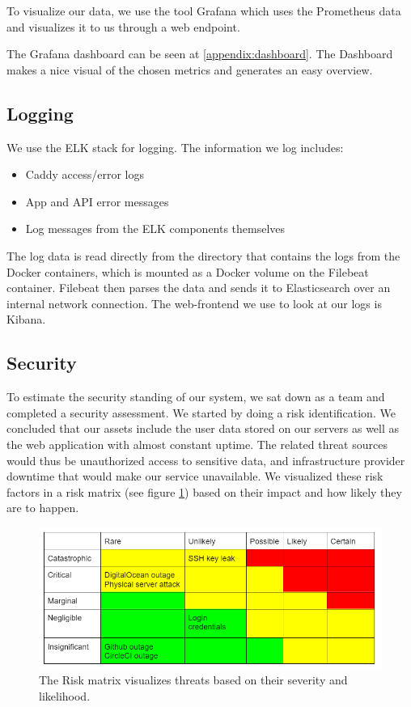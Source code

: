 To visualize our data, we use the tool Grafana which uses the Prometheus data and visualizes it to us through a web endpoint.

The Grafana dashboard can be seen at \ref{appendix:dashboard}. The Dashboard makes a nice visual of the chosen metrics and generates an easy overview.

\subsection{Logging}
We use the ELK stack for logging. The information we log includes:

\begin{itemize}
    \item Caddy access/error logs
    \item App and API error messages
    \item Log messages from the ELK components themselves
\end{itemize}

The log data is read directly from the directory that contains the logs from the Docker containers, which is mounted as a Docker volume on the Filebeat container. Filebeat then parses the data and sends it to Elasticsearch over an internal network connection. The web-frontend we use to look at our logs is Kibana.




\subsection{Security}
To estimate the security standing of our system, we sat down as a team and completed a security assessment. We started by doing a risk identification. We concluded that our assets include the user data stored on our servers as well as the web application with almost constant uptime. The related threat sources would thus be unauthorized access to sensitive data, and infrastructure provider downtime that would make our service unavailable. We visualized these risk factors in a risk matrix (see figure \ref{fig:Risk_matrix}) based on their impact and how likely they are to happen.

\begin{figure}[H]
    \centering
    \includegraphics[scale=0.85]{images/risk_matrix.png}
    \caption{The Risk matrix visualizes threats based on their severity and likelihood.}
    \label{fig:Risk_matrix}
\end{figure}

